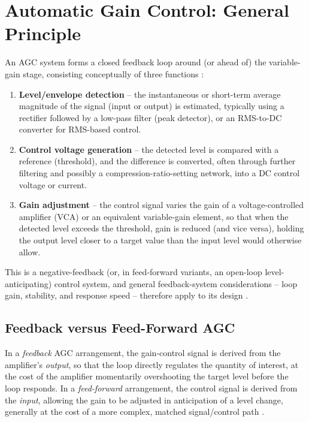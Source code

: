 \section{Automatic Gain Control: General Principle}

An AGC system forms a closed feedback loop around (or ahead of) the variable-gain stage, consisting conceptually of three functions \cite{ref5,ref6}:

\begin{enumerate}
    \item \textbf{Level/envelope detection} -- the instantaneous or short-term average magnitude of the signal (input or output) is estimated, typically using a rectifier followed by a low-pass filter (peak detector), or an RMS-to-DC converter for RMS-based control.
    \item \textbf{Control voltage generation} -- the detected level is compared with a reference (threshold), and the difference is converted, often through further filtering and possibly a compression-ratio-setting network, into a DC control voltage or current.
    \item \textbf{Gain adjustment} -- the control signal varies the gain of a voltage-controlled amplifier (VCA) or an equivalent variable-gain element, so that when the detected level exceeds the threshold, gain is reduced (and vice versa), holding the output level closer to a target value than the input level would otherwise allow.
\end{enumerate}

This is a negative-feedback (or, in feed-forward variants, an open-loop level-anticipating) control system, and general feedback-system considerations -- loop gain, stability, and response speed -- therefore apply to its design \cite{ref5}.

\subsection{Feedback versus Feed-Forward AGC}

In a \emph{feedback} AGC arrangement, the gain-control signal is derived from the amplifier's \emph{output}, so that the loop directly regulates the quantity of interest, at the cost of the amplifier momentarily overshooting the target level before the loop responds. In a \emph{feed-forward} arrangement, the control signal is derived from the \emph{input}, allowing the gain to be adjusted in anticipation of a level change, generally at the cost of a more complex, matched signal/control path \cite{ref6}.

